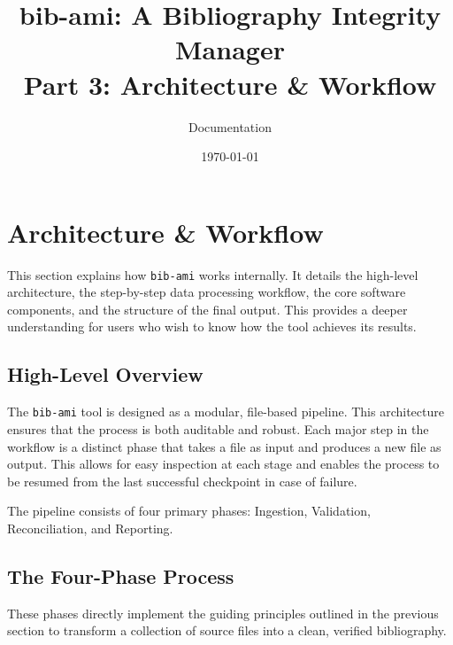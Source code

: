 \documentclass[11pt, a4paper]{article}
\title{\textbf{bib-ami}: A Bibliography Integrity Manager \\ \large Part 3: Architecture \& Workflow}
\author{Documentation}
\date{\today}
\begin{document}
\maketitle
\tableofcontents
\newpage

\section{Architecture \& Workflow}

This section explains how \texttt{bib-ami} works internally. It details the high-level architecture, the step-by-step data processing workflow, the core software components, and the structure of the final output. This provides a deeper understanding for users who wish to know how the tool achieves its results.

\subsection{High-Level Overview}

The \texttt{bib-ami} tool is designed as a modular, file-based pipeline. This architecture ensures that the process is both auditable and robust. Each major step in the workflow is a distinct phase that takes a file as input and produces a new file as output. This allows for easy inspection at each stage and enables the process to be resumed from the last successful checkpoint in case of failure.

The pipeline consists of four primary phases: Ingestion, Validation, Reconciliation, and Reporting.

\subsection{The Four-Phase Process}

These phases directly implement the guiding principles outlined in the previous section to transform a collection of source files into a clean, verified bibliography.
\end{document}
